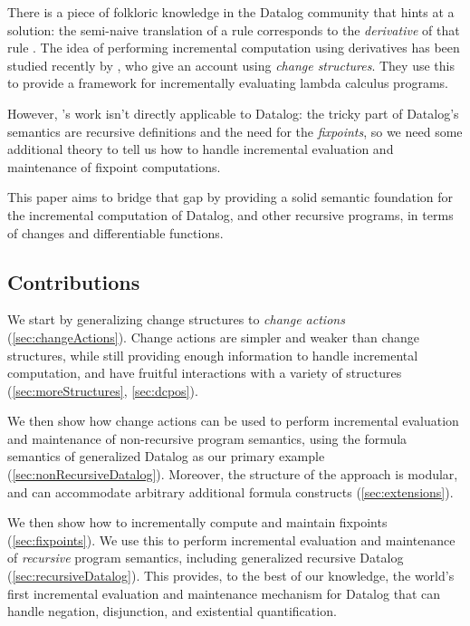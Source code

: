 There is a piece of folkloric knowledge in the Datalog community that hints at a
solution: the semi-naive translation of a rule corresponds to the
\emph{derivative} of that rule \autocites{bancilhon1986naive}[section
3.2.2]{bancilhon1986amateur}. The idea of performing incremental computation using derivatives has been
studied recently by \textcite{cai2014changes}, who give an account using
\emph{change structures}. They use this to provide a framework for incrementally evaluating lambda calculus programs.

However, \citeauthor{cai2014changes}'s work isn't directly applicable to Datalog: the tricky part
of Datalog's semantics are recursive definitions and the need for the
\emph{fixpoints}, so we need some additional theory to tell us how to
handle incremental evaluation and maintenance of fixpoint computations.

This paper aims to bridge that gap by providing a solid semantic foundation for the incremental
computation of Datalog, and other recursive programs, in terms of changes and
differentiable functions.

\subsection{Contributions}

We start by generalizing change structures to
\emph{change actions} (\cref{sec:changeActions}). Change actions are simpler and weaker than change
structures, while still providing enough information to handle incremental
computation, and have fruitful
interactions with a variety of structures (\cref{sec:moreStructures}, \cref{sec:dcpos}).

We then show how change actions can be used to perform incremental evaluation and maintenance
of non-recursive program semantics, using the formula semantics of generalized Datalog as our primary
example (\cref{sec:nonRecursiveDatalog}). Moreover, the structure of the
approach is modular, and can accommodate arbitrary additional
formula constructs (\cref{sec:extensions}).

We then show how to incrementally compute and maintain fixpoints
(\cref{sec:fixpoints}). We use this to perform incremental evaluation and
maintenance of \emph{recursive} program semantics, including generalized
recursive Datalog (\cref{sec:recursiveDatalog}). This provides, to the best
of our knowledge, the world's first incremental
evaluation and maintenance mechanism for Datalog that can handle negation,
disjunction, and existential quantification. 

